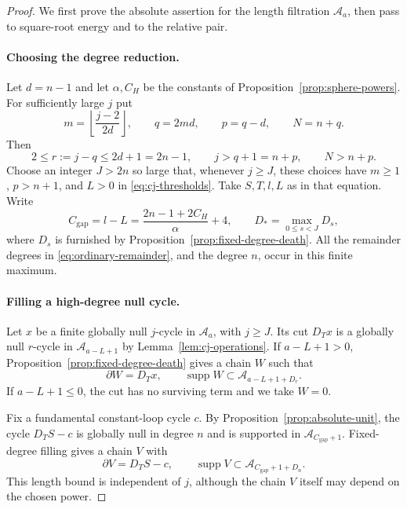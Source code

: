 \begin{proof}
We first prove the absolute assertion for the length filtration
$\mathcal A_a$, then pass to square-root energy and to the relative pair.

\paragraph{Choosing the degree reduction.}
Let $d=n-1$ and let $\alpha,C_H$ be the constants of
Proposition~\ref{prop:sphere-powers}.  For sufficiently large $j$ put
\begin{equation}\label{eq:ordinary-degrees}
 m=\left\lfloor\frac{j-2}{2d}\right\rfloor,
 \qquad q=2md,\qquad p=q-d,\qquad N=n+q.
\end{equation}
Then
\begin{equation}\label{eq:ordinary-remainder}
 2\le r:=j-q\le2d+1=2n-1,
 \qquad j>q+1=n+p,
 \qquad N>n+p.
\end{equation}
Choose an integer $J>2n$ so large that, whenever $j\ge J$, these choices
have $m\ge1$, $p>n+1$, and $L>0$ in
\eqref{eq:cj-thresholds}.  Take $S,T,l,L$ as in that equation.  Write
\begin{equation}\label{eq:ordinary-gap}
 C_{\mathrm{gap}}=l-L
   =\frac{2n-1+2C_H}{\alpha}+4,
 \qquad
 D_* =\max_{0\le s<J}D_s,
\end{equation}
where $D_s$ is furnished by Proposition~\ref{prop:fixed-degree-death}.
All the remainder degrees in \eqref{eq:ordinary-remainder}, and the
degree $n$, occur in this finite maximum.

\paragraph{Filling a high-degree null cycle.}
Let $x$ be a finite globally null $j$-cycle in $\mathcal A_a$, with
$j\ge J$.  Its cut $D_Tx$ is a globally null $r$-cycle in
$\mathcal A_{a-L+1}$ by Lemma~\ref{lem:cj-operations}.
If $a-L+1>0$, Proposition~\ref{prop:fixed-degree-death} gives a chain
$W$ such that
\[
 \partial W=D_Tx,
 \qquad\operatorname{supp}W\subset\mathcal A_{a-L+1+D_r}.
\]
If $a-L+1\le0$, the cut has no surviving term and we take $W=0$.

Fix a fundamental constant-loop cycle $c$.  By
Proposition~\ref{prop:absolute-unit}, the cycle $D_TS-c$ is globally
null in degree $n$ and is supported in
$\mathcal A_{C_{\mathrm{gap}}+1}$.  Fixed-degree filling gives a chain
$V$ with
\begin{equation}\label{eq:ordinary-correction}
 \partial V=D_TS-c,
 \qquad
 \operatorname{supp}V\subset
 \mathcal A_{C_{\mathrm{gap}}+1+D_n}.
\end{equation}
This length bound is independent of $j$, although the chain $V$ itself
may depend on the chosen power.


\end{proof}
